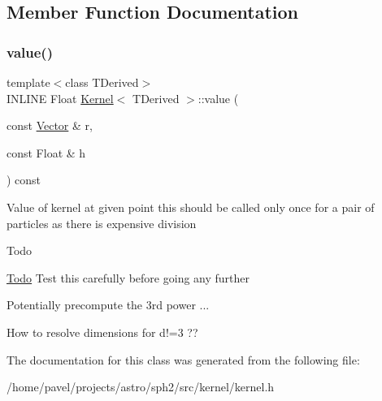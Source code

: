 \subsection{Member Function Documentation}
\hypertarget{classKernel_aa8b9718f58edb6353460653f61b28131}{}\label{classKernel_aa8b9718f58edb6353460653f61b28131} 
\subsubsection{\texorpdfstring{value()}{value()}}
{\footnotesize\ttfamily template$<$class T\+Derived$>$ \\
I\+N\+L\+I\+NE Float \hyperlink{classKernel}{Kernel}$<$ T\+Derived $>$\+::value (\begin{DoxyParamCaption}\item[{const \hyperlink{classBasicVector}{Vector} \&}]{r,  }\item[{const Float \&}]{h }\end{DoxyParamCaption}) const\hspace{0.3cm}{\ttfamily [inline]}}

Value of kernel at given point this should be called only once for a pair of particles as there is expensive division \begin{DoxyRefDesc}{Todo}
\item[\hyperlink{todo__todo000016}{Todo}]Test this carefully before going any further 

Potentially precompute the 3rd power ... 

How to resolve dimensions for d!=3 ?? \end{DoxyRefDesc}


The documentation for this class was generated from the following file\+:\begin{DoxyCompactItemize}
\item 
/home/pavel/projects/astro/sph2/src/kernel/kernel.\+h\end{DoxyCompactItemize}
